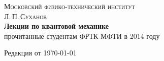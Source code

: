 \begin{titlepage}
\center
 
\textsc{\large Московский физико-технический институт}\\[1cm]
\textsc{\Large Л.\,П.\,Суханов}\\[6cm]

{ \Huge \bfseries Лекции по квантовой механике}\\[0.4cm]
{\large прочитанные студентам ФРТК МФТИ в 2014 году}
 
\vfill

{\large Редакция от \today}
\end{titlepage}
\clearpage\thispagestyle{empty}